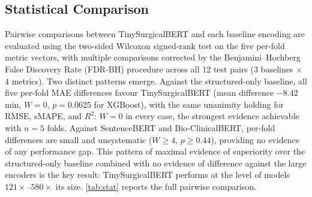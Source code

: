 \documentclass[3p]{elsarticle}
\begin{document}
\subsection{Statistical Comparison}
\label{sec:stat}

Pairwise comparisons between TinySurgicalBERT and each baseline encoding are evaluated using the two-sided Wilcoxon signed-rank test on the five per-fold metric vectors, with multiple comparisons corrected by the Benjamini--Hochberg False Discovery Rate (FDR-BH) procedure across all 12 test pairs (3 baselines $\times$ 4 metrics). Two distinct patterns emerge. Against the structured-only baseline, all five per-fold MAE differences favour TinySurgicalBERT (mean difference $-8.42$ min, $W = 0$, $p = 0.0625$ for XGBoost), with the same unanimity holding for RMSE, sMAPE, and $R^{2}$: $W = 0$ in every case, the strongest evidence achievable with $n = 5$ folds. Against SentenceBERT and Bio-ClinicalBERT, per-fold differences are small and unsystematic ($W \geq 4$, $p \geq 0.44$), providing no evidence of any performance gap. This pattern of maximal evidence of superiority over the structured-only baseline combined with no evidence of difference against the large encoders is the key result: TinySurgicalBERT performs at the level of models $121\times$--$580\times$ its size. \cref{tab:stat} reports the full pairwise comparison.
\end{document}
